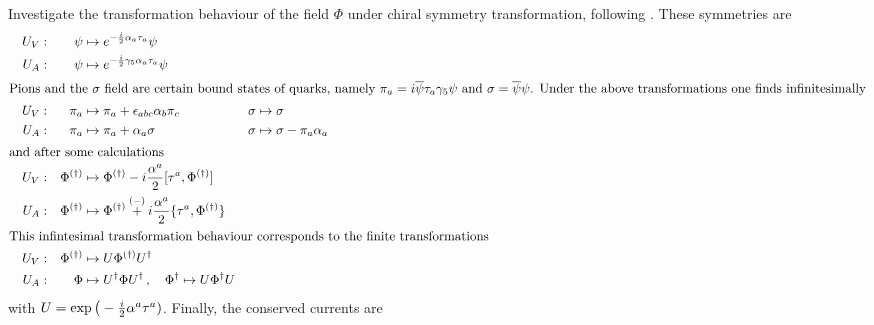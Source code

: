 Investigate the transformation behaviour of the field $\Phi$ under chiral symmetry transformation, following \cite{Koch_1997}. These symmetries are
\begin{subequations}
    \begin{align}
         &  & U_V: &  & \psi             & \mapsto e^{-\frac{{i}}{2}\alpha_a\tau_a}\psi                                             &        &                                  \\
         &  & U_A: &  & \psi             & \mapsto e^{-\frac{{i}}{2}\gamma_5\alpha_a\tau_a}\psi                                     &        &                                  \\
        \intertext{Pions and the $\sigma$ field are certain bound states of quarks, namely $\pi_a={i}\overline{\psi}\tau_a\gamma_5\psi$ and $\sigma=\overline{\psi}\psi$. Under the above transformations one finds infinitesimally}
         &  & U_V: &  & \pi_a            & \mapsto\pi_a+\epsilon_{abc}\alpha_b\pi_c                                                    & \sigma & \mapsto\sigma               &  & \\
         &  & U_A: &  & \pi_a            & \mapsto\pi_a+\alpha_a\sigma                                                                 & \sigma & \mapsto\sigma-\pi_a\alpha_a &  & \\
        \intertext{and after some calculations}
         &  & U_V: &  & \Phi^{(\dagger)} & \mapsto \Phi^{(\dagger)}-{i}\frac{\alpha^a}{2}[\tau^a,\Phi^{(\dagger)}]                                                              \\
         &  & U_A: &  & \Phi^{(\dagger)} & \mapsto \Phi^{(\dagger)}\overset{(-)}{+}{i}\frac{\alpha^a}{2}\{\tau^a,\Phi^{(\dagger)}\} &        &                                  \\
        \intertext{This infintesimal transformation behaviour corresponds to the finite transformations}
         &  & U_V: &  & \Phi^{(\dagger)} & \mapsto U\Phi^{(\dagger)}U^\dagger                                                          &        &                                  \\
         &  & U_A: &  & \Phi             & \mapsto U^\dagger\Phi U^\dagger\,,\quad \Phi^\dagger\mapsto U\Phi^\dagger U                 &        &
    \end{align}
\end{subequations}
with $U=\exp\big(-\frac{{i}}{2}\alpha^a\tau^a)$. Finally, the conserved currents are
